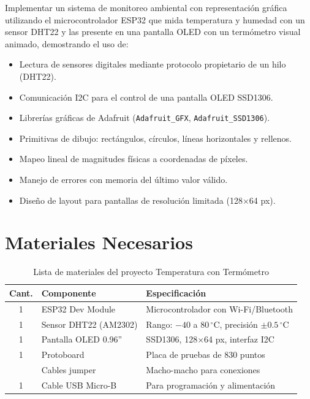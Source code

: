 \documentclass[12pt,a4paper]{article}
\begin{document}
Implementar un sistema de monitoreo ambiental con representación gráfica utilizando el microcontrolador ESP32 que mida temperatura y humedad con un sensor DHT22 y las presente en una pantalla OLED con un termómetro visual animado, demostrando el uso de:
\begin{itemize}
    \item Lectura de sensores digitales mediante protocolo propietario de un hilo (DHT22).
    \item Comunicación I2C para el control de una pantalla OLED SSD1306.
    \item Librerías gráficas de Adafruit (\texttt{Adafruit\_GFX}, \texttt{Adafruit\_SSD1306}).
    \item Primitivas de dibujo: rectángulos, círculos, líneas horizontales y rellenos.
    \item Mapeo lineal de magnitudes físicas a coordenadas de píxeles.
    \item Manejo de errores con memoria del último valor válido.
    \item Diseño de layout para pantallas de resolución limitada (128$\times$64 px).
\end{itemize}

\section{Materiales Necesarios}

\begin{table}[h!]
\centering
\begin{tabular}{cll}
\toprule
\textbf{Cant.} & \textbf{Componente} & \textbf{Especificación} \\
\midrule
1 & ESP32 Dev Module & Microcontrolador con Wi-Fi/Bluetooth \\
1 & Sensor DHT22 (AM2302) & Rango: $-40$ a $80\,^\circ$C, precisión $\pm 0.5\,^\circ$C \\
1 & Pantalla OLED 0.96'' & SSD1306, 128$\times$64 px, interfaz I2C \\
1 & Protoboard & Placa de pruebas de 830 puntos \\
  & Cables jumper & Macho-macho para conexiones \\
1 & Cable USB Micro-B & Para programación y alimentación \\
\bottomrule
\end{tabular}
\caption{Lista de materiales del proyecto Temperatura con Termómetro}
\end{table}
\end{document}

